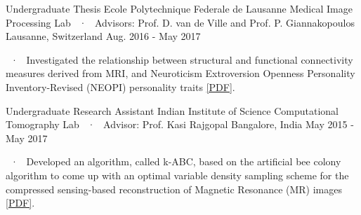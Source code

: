 \begin{cventries}
  \cventryLab
    {Undergraduate Thesis} %
    {Ecole Polytechnique Federale de Lausanne} %
    {Medical Image Processing Lab ~·~ Advisors: Prof. D. van de Ville and Prof. P. Giannakopoulos} %
    {Lausanne, Switzerland} %
    {Aug. 2016 - May 2017} %
    { %
      \begin{cvitems}
		\item ~·~ Investigated the relationship between structural and functional connectivity measures derived from MRI, and Neuroticism Extroversion Openness Personality Inventory-Revised (NEOPI) personality traits \href{https://doi.org/10.3389/fpsyg.2018.02652}{[PDF]}.
      \end{cvitems}
    }

  \cventryLab
    {Undergraduate Research Assistant} %
    {Indian Institute of Science} %
    {Computational Tomography Lab ~·~ Advisor: Prof. Kasi Rajgopal} %
    {Bangalore, India} %
    {May 2015 - May 2017} %
    { %
      \begin{cvitems}
      \item ~·~ Developed an algorithm, called k-ABC, based on the artificial bee colony algorithm to come up with an optimal variable density sampling scheme for the compressed sensing-based reconstruction of Magnetic Resonance (MR) images \href{https://doi.org/10.1109/TENCON.2016.7848212}{[PDF]}.
      \end{cvitems}
    }


\end{cventries}

